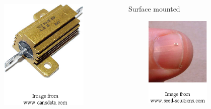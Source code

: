 \documentclass[beamer]{standalone}
\begin{document}
\begin{frame}
\begin{columns}[t]
\begin{column}{.3\textwidth}
\begin{figure}
   \includegraphics[width=0.85\textwidth]{./pics/resistors2.png}
   \end{figure}
  \end{column}
  \begin{column}{.3\textwidth}
   Surface mounted
   \begin{figure}
   \includegraphics[width=0.85\textwidth]{./pics/resistors3.png}

\end{figure}
\end{column}
\end{columns}
\end{frame}
\end{document}
